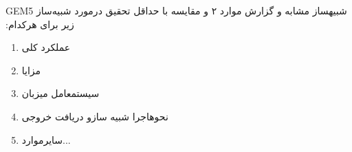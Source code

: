 \begin{qsolve}
	‫تحقیق‬ ‫درمورد‬ ‫شبیه‌ساز ‬‫‪GEM5‬‬ ‫و‬ ‫مقایسه‬ ‫با‬ ‫حداقل‬ ‫‪۲‬‬ ‫شبیه‬‫ساز ‬‫مشابه‬ ‫و‬ ‫گزارش‬ ‫موارد‬ ‫زیر‬ ‫برای‬
	‫هرکدام‪:
	\begin{enumerate}
		\item ‫عملکرد‬‫ کلی‬
		\item ‫مزایا‬
		\item ‫سیستم‬‫عامل ‬‫میزبان‬
		\item ‫نحوه‬‫اجرا‬ ‫شبیه‬ ‫ساز‬‫و‬ ‫دریافت‬ ‫خروجی‬
		\item ‫سایر‬‫موارد‬...
	\end{enumerate}
\end{qsolve}

